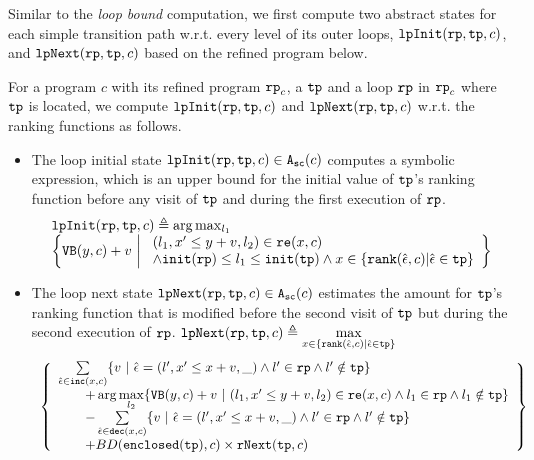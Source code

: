 Similar to the \emph{loop bound} computation,
we first compute two abstract states for each simple transition path w.r.t. every level of its outer loops,
$\mathtt{lpInit}(\mathtt{rp}, \mathtt{tp}, c)$, and $\mathtt{lpNext}(\mathtt{rp}, \mathtt{tp}, c)$ based on the refined program below.
\begin{defn}
\label{def:alg-loopabsstate}
For a program $c$ with its refined program $\mathtt{rp}_c$, a $\mathtt{tp}$ and a loop $\mathtt{rp}$ in $\mathtt{rp}_c$ where $\mathtt{tp}$ is located, we compute 
$\mathtt{lpInit}(\mathtt{rp}, \mathtt{tp}, c)$ and $\mathtt{lpNext}(\mathtt{rp}, \mathtt{tp}, c)$
w.r.t. the ranking functions as follows.
 \begin{itemize}%
 \item 
The loop initial state 
$\mathtt{lpInit}(\mathtt{rp}, \mathtt{tp}, c) \in {\ensuremath{\mathtt{A_{sc}}}}(c)$ computes a symbolic expression, which is an upper bound for the initial value of $\mathtt{tp}$'s ranking function before
any visit of $\mathtt{tp}$ and during the first execution of $\mathtt{rp}$.
\[
 \begin{array}{l}
 \lpinit(\rprog, \tpath, c) \triangleq 
 \arg\max_{l_1}
 \\
 \left\{
 \varinvar(y, c) + v ~\middle\vert~ 
 \begin{array}{l} 
 (l_1, x' \leq y + v, l_2) \in \reset(x, c) 
 \\
 \land \absinit(\rprog) \leq l_1 \leq \absinit(\tpath)
 \land
 x \in \left\{ \locbound(\absevent, c) | \absevent \in \tpath \right\}
 \end{array}
 \right\}
 \end{array}
 \]
\item
The loop next state 
$\mathtt{lpNext}(\mathtt{rp}, \mathtt{tp}, c) \in {\ensuremath{\mathtt{A_{sc}}}}(c)$ 
estimates the amount for $\mathtt{tp}$'s ranking function
that is modified before
the second visit of $\mathtt{tp}$ but during the second execution of $\mathtt{rp}$.
$ 
\lpnext(\rprog, \tpath, c) \triangleq 
\max\limits_{x \in \left\{ \locbound(\absevent, c) | \absevent \in \tpath \right\}}
$
%
{\small
\[
 \begin{array}{l}
 \left\{
 \begin{array}{l}
 \sum\limits_{\absevent \in \inc(x, c) }
 \left\{ 
 v ~\middle\vert~ \absevent = (l', x' \leq x + v, \_) \land l' \in \rprog 
 \land l' \notin \tpath \right\}
 \\ \qquad 
 + \arg\max\limits_{l_2 }
 \left\{ \varinvar(y, c) + v ~\middle\vert~ 
 (l_1, x' \leq y + v, l_2) \in \reset(x, c) \land l_1 \in \rprog \land l_1 \notin \tpath\right\}
 \\ \qquad 
 - \sum\limits_{ \absevent \in \dec(x, c) }\left\{ 
 v 
 ~\middle\vert~ \absevent = (l', x' \leq x + v, \_) \land l' \in \rprog \land l' \notin \tpath \right\}
 \\ \qquad 
 + BD(\kw{enclosed}(\tpath), c) \times \rfnext(\tpath, c)
 \end{array}
 \right\}
 \end{array}
 \]
 }
 \end{itemize}
\end{defn}
